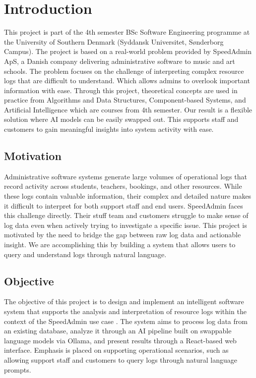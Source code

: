 \section{Introduction} \label{sec:intro}

This project is part of the 4th semester BSc Software Engineering programme at the University of Southern Denmark (Syddansk Universitet, Sønderborg Campus). The project is based on a real-world problem provided by SpeedAdmin ApS, a Danish company delivering administrative software to music and art schools. The problem focuses on the challenge of interpreting complex resource logs that are difficult to understand. Which allows admins to overlook important information with ease. Through this project, theoretical concepts are used in practice from Algorithms and Data Structures, Component-based Systems, and Artificial Intelligence which are courses from 4th semester. Our result is a flexible solution where AI models can be easily swapped out. This supports staff and customers to gain meaningful insights into system activity with ease.

\subsection{Motivation}
Administrative software systems generate large volumes of operational logs that record activity across students, teachers, bookings, and other resources. While these logs contain valuable information, their complex and detailed nature makes it difficult to interpret for both support staff and end users. SpeedAdmin faces this challenge directly. Their stuff team and customers struggle to make sense of log data even when actively trying to investigate a specific issue. This project is motivated by the need to bridge the gap between raw log data and actionable insight. We are accomplishing this by building a system that allows users to query and understand logs through natural language.

\subsection{Objective}
The objective of this project is to design and implement an intelligent software system that supports the analysis and interpretation of resource logs within the context of the SpeedAdmin use case \cite{speedadmin_brief}. The system aims to process log data from an existing database, analyze it through an AI pipeline built on swappable language models via Ollama, and present results through a React-based web interface. Emphasis is placed on supporting operational scenarios, such as allowing support staff and customers to query logs through natural language prompts.

